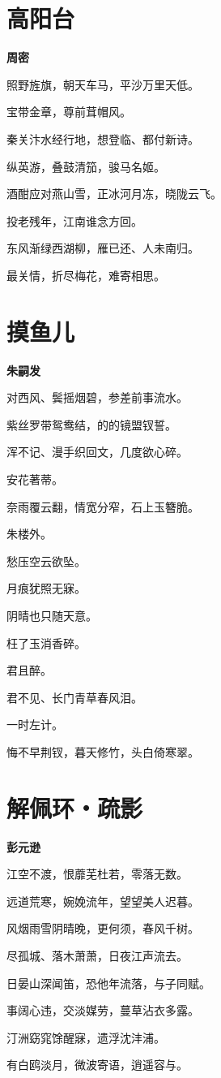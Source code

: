 \documentclass[12pt,a4paper]{ctexbook}
\begin{document}
\section{高阳台}
\textbf{周密}\par\vspace{0.5em}
照野旌旗，朝天车马，平沙万里天低。\par
宝带金章，尊前茸帽风。\par
秦关汴水经行地，想登临、都付新诗。\par
纵英游，叠鼓清笳，骏马名姬。\par
酒酣应对燕山雪，正冰河月冻，晓陇云飞。\par
投老残年，江南谁念方回。\par
东风渐绿西湖柳，雁已还、人未南归。\par
最关情，折尽梅花，难寄相思。\par

\section{摸鱼儿}
\textbf{朱嗣发}\par\vspace{0.5em}
对西风、鬓摇烟碧，参差前事流水。\par
紫丝罗带鸳鸯结，的的镜盟钗誓。\par
浑不记、漫手织回文，几度欲心碎。\par
安花著蒂。\par
奈雨覆云翻，情宽分窄，石上玉簪脆。\par
朱楼外。\par
愁压空云欲坠。\par
月痕犹照无寐。\par
阴晴也只随天意。\par
枉了玉消香碎。\par
君且醉。\par
君不见、长门青草春风泪。\par
一时左计。\par
悔不早荆钗，暮天修竹，头白倚寒翠。\par

\section{解佩环・疏影}
\textbf{彭元逊}\par\vspace{0.5em}
江空不渡，恨蘼芜杜若，零落无数。\par
远道荒寒，婉娩流年，望望美人迟暮。\par
风烟雨雪阴晴晚，更何须，春风千树。\par
尽孤城、落木萧萧，日夜江声流去。\par
日晏山深闻笛，恐他年流落，与子同赋。\par
事阔心违，交淡媒劳，蔓草沾衣多露。\par
汀洲窈窕馀醒寐，遗浮沈沣浦。\par
有白鸥淡月，微波寄语，逍遥容与。\par
\end{document}
